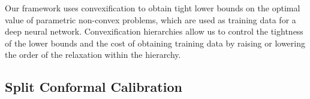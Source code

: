 \documentclass[10pt]{article} %
\theoremstyle{plain}
\theoremstyle{definition}
\theoremstyle{remark}
\begin{document}


Our framework uses convexification to obtain tight lower bounds on the optimal value of parametric non-convex problems, which are used as training data for a deep neural network. Convexification hierarchies allow us to control the tightness of the lower bounds and the cost of obtaining training data by raising or lowering the order of the relaxation within the hierarchy.

\subsection*{Split Conformal Calibration}
\end{document}
